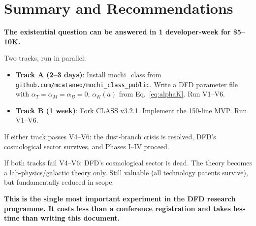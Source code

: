 \documentclass[11pt]{article}
\theoremstyle{definition}
\theoremstyle{remark}
\begin{document}
\section*{Summary and Recommendations}

\begin{tcolorbox}[colback=blue!5!white, colframe=blue!70!black]
\textbf{The existential question can be answered in 1 developer-week
for \$5--10K.}

Two tracks, run in parallel:
\begin{itemize}
\item \textbf{Track A (2--3 days)}: Install mochi\_class from
  \texttt{github.com/mcataneo/mochi\_class\_public}. Write a
  DFD parameter file with $\alpha_T = \alpha_M = \alpha_B = 0$,
  $\alpha_K(a)$ from Eq.~\eqref{eq:alphaK}. Run V1--V6.
\item \textbf{Track B (1 week)}: Fork CLASS v3.2.1. Implement the
  150-line MVP. Run V1--V6.
\end{itemize}

If either track passes V4--V6: the dust-branch crisis is resolved,
DFD's cosmological sector survives, and Phases I--IV proceed.

If both tracks fail V4--V6: DFD's cosmological sector is dead.
The theory becomes a lab-physics/galactic theory only. Still
valuable (all technology patents survive), but fundamentally
reduced in scope.

\textbf{This is the single most important experiment in the DFD
research programme. It costs less than a conference registration
and takes less time than writing this document.}
\end{tcolorbox}
\end{document}
